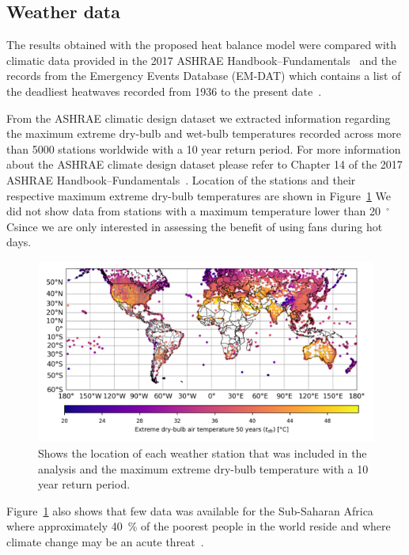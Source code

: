 \subsection{Weather data}\label{subsec:weather-data}

The results obtained with the proposed heat balance model were compared with climatic data provided in the 2017 ASHRAE Handbook--Fundamentals~\cite{ASHRA2017} and the records from the Emergency Events Database (EM-DAT) which contains a list of the deadliest heatwaves recorded from 1936 to the present date~\cite{EMDATThe70:online}.

From the ASHRAE climatic design dataset we extracted information regarding the maximum extreme dry-bulb and wet-bulb temperatures recorded across more than 5000 stations worldwide with a 10 year return period.
For more information about the ASHRAE climate design dataset please refer to Chapter 14 of the 2017 ASHRAE Handbook--Fundamentals~\cite{ASHRA2017}.
Location of the stations and their respective maximum extreme dry-bulb temperatures are shown in Figure~\ref{fig:world-map}
We did not show data from stations with a maximum temperature lower than 20~$^\circ$C\@ since we are only interested in assessing the benefit of using fans during hot days.

\begin{figure}[thb!]
    \centering
    \includegraphics[width=\textwidth]{figures/world-map.png}
    \caption{Shows the location of each weather station that was included in the analysis and the maximum extreme dry-bulb temperature with a 10 year return period.}
    \label{fig:world-map}
\end{figure}

Figure~\ref{fig:world-map} also shows that few data was available for the Sub-Saharan Africa where approximately 40~\% of the poorest people in the world reside and where climate change may be an acute threat~\cite{PovertyO1:online}.

